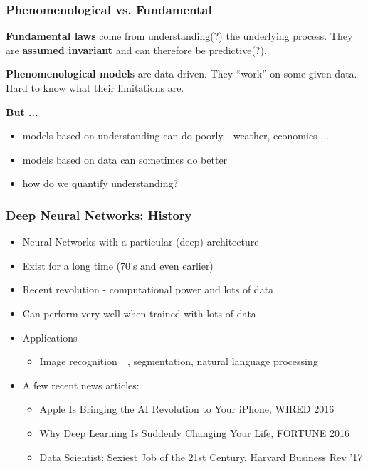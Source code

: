 \documentclass[12pt,fleqn]{beamer}
\begin{document}
\begin{frame}\frametitle{Phenomenological vs. Fundamental}

\textbf{Fundamental laws} come from understanding(?) the underlying process.
They are {\bf assumed invariant} and can therefore be predictive(?).

\bigskip

\textbf{Phenomenological models} are data-driven. They ``work'' on some given data.
Hard to know what their limitations are.

\bigskip

{\bf But ...}
\begin{itemize}
\item models based on understanding can do poorly - weather, economics ...
\item models based on data can sometimes do better
\item how do we quantify understanding?
\end{itemize}

\end{frame}

\begin{frame}\frametitle{Deep Neural Networks: History}

\begin{itemize}
	\item Neural Networks with a particular (deep) architecture
    \item Exist for a long time (70's and even earlier)~\cite{Rosenblatt1958,Rumelhart1986,LeCun1990}
    \item Recent revolution - computational power and lots of data~\cite{bengio2009learning,RainaEtAl2009,lecun2015deep}
    \item Can perform very well when trained with lots of data
    \item Applications
    \begin{itemize}
    \item Image recognition~~\cite{hinton2012deep,KrizhevskySutskeverHinton2012,lecun2015deep}, segmentation, natural language processing~\cite{BordesEtAl2014,CollobertEtAl2011,  JeanEtAl2014}
    \end{itemize}


    \pause

\item A few recent news articles:

 \begin{itemize}
    \item
{Apple Is Bringing the AI Revolution to Your iPhone, WIRED 2016}
\item
{Why Deep Learning Is Suddenly Changing Your Life,  FORTUNE 2016}
\item Data Scientist: Sexiest Job of the 21st Century, Harvard Business Rev ’17
\end{itemize}

\end{itemize}
\end{frame}
\end{document}
